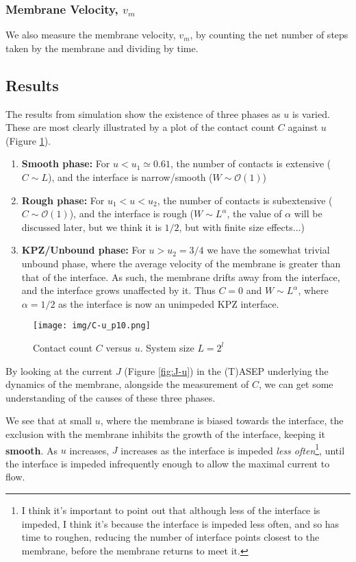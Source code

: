 \documentclass[a4paper,10pt]{article}
\newcommand{\fref}[1]{Figure \ref{#1}}
\newcommand{\Or}{\mathcal{O}}
\begin{document}
\subsubsection*{Membrane Velocity, $v_m$}

We also measure the membrane velocity, $v_m$, by counting the net number of steps taken by the membrane and dividing by time. 

\subsection{Results}\label{sec:results}

The results from simulation show the existence of three phases as $u$ is varied. These are most clearly illustrated by a plot of the contact count $C$ against $u$ (\fref{fig:C-u}).
\begin{enumerate}
 \item {\bf Smooth phase:} For $u < u_1 \simeq 0.61$, the number of contacts is extensive ($C \sim L$), and the interface is narrow/smooth ($W \sim \Or(1)$)
 \item {\bf Rough phase:} For $u_1 < u < u_2$, the number of contacts is subextensive ($C \sim \Or(1)$), and the interface is rough ($W \sim L^\alpha$, the value of $\alpha$ will be discussed later, but we think it is $1/2$, but with finite size effects...)
 \item {\bf KPZ/Unbound phase:} For $u > u_2 = 3/4$ we have the somewhat trivial unbound phase, where the average velocity of the membrane is greater than that of the interface. As such, the membrane drifts away from the interface, and the interface grows unaffected by it. Thus $C = 0$ and $W \sim L^\alpha$, where $\alpha = 1/2$ as the interface is now an unimpeded KPZ interface.
\end{enumerate}

\begin{figure}[h!]
  \centering
  \texttt{[image: img/C-u\_p10.png]}
  \caption{Contact count $C$ versus $u$. System size $L = 2^l$}
  \label{fig:C-u}
\end{figure}

By looking at the current $J$ (\fref{fig:J-u}) in the (T)ASEP underlying the dynamics of the membrane, alongside the measurement of $C$, we can get some understanding of the causes of these three phases. 

We see that at small $u$, where the membrane is biased towards the interface, the exclusion with the membrane inhibits the growth of the interface, keeping it {\bf smooth}. As $u$ increases, $J$ increases as the interface is impeded \emph{less often}\footnote{I think it's important to point out that although less of the interface is impeded, I think it's because the interface is impeded less often, and so has time to roughen, reducing the number of interface points closest to the membrane, before the membrane returns to meet it.}, until the interface is impeded infrequently enough to allow the maximal current to flow. 
\end{document}
